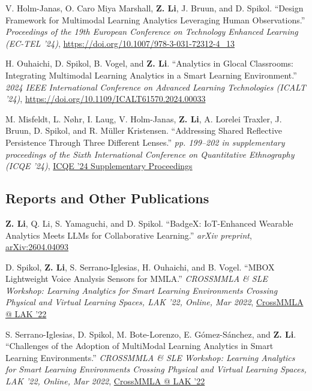 \documentclass[11pt,letterpaper]{report}
\begin{document}
\begin{tablist}
        \item[2024] \tab{} V. Holm-Janas, O. Caro Miya Marshall, \textbf{Z. Li}, J. Bruun, and D. Spikol. \enquote{Design Framework for Multimodal Learning Analytics Leveraging Human Observations.} \textit{Proceedings of the 19th European Conference on Technology Enhanced Learning (EC-TEL '24)}, \href{https://doi.org/10.1007/978-3-031-72312-4_13}{https://doi.org/10.1007/978-3-031-72312-4\_13}
        \item[2024] \tab{} H. Ouhaichi, D. Spikol, B. Vogel, and \textbf{Z. Li}. \enquote{Analytics in Glocal Classrooms: Integrating Multimodal Learning Analytics in a Smart Learning Environment.} \textit{2024 IEEE International Conference on Advanced Learning Technologies (ICALT '24)}, \href{https://doi.org/10.1109/ICALT61570.2024.00033}{https://doi.org/10.1109/ICALT61570.2024.00033}
        \item[2024] \tab{} M. Misfeldt, L. Nøhr, I. Laug, V. Holm-Janas, \textbf{Z. Li}, A. Lorelei Traxler, J. Bruun, D. Spikol, and R. Müller Kristensen. \enquote{Addressing Shared Reflective Persistence Through Three Different Lenses.} \textit{pp. 199--202 in supplementary proceedings of the Sixth International Conference on Quantitative Ethnography (ICQE '24)}, \href{https://www.qesoc.org/images/pdf/ICQE24_Supplement_Proceedings.pdf}{ICQE '24 Supplementary Proceedings}
    \end{tablist}

    \subsection*{Reports and Other Publications}

    \begin{tablist}
        \item[2026] \tab{} \textbf{Z. Li}, Q. Li, S. Yamaguchi, and D. Spikol. \enquote{BadgeX: IoT-Enhanced Wearable Analytics Meets LLMs for Collaborative Learning.} \textit{arXiv preprint}, \href{https://arxiv.org/abs/2604.04093}{arXiv:2604.04093}
        \item[2022] \tab{} D. Spikol, \textbf{Z. Li}, S. Serrano-Iglesias, H. Ouhaichi, and B. Vogel. \enquote{MBOX Lightweight Voice Analysis Sensors for MMLA.} \textit{CROSSMMLA \& SLE Workshop: Learning Analytics for Smart Learning Environments Crossing Physical and Virtual Learning Spaces, LAK '22, Online, Mar 2022}, \href{https://lizaibeim.github.io/pubs/CROSSMMLA22_paper_5.pdf}{CrossMMLA @ LAK '22}
        \item[2022] \tab{} S. Serrano-Iglesias, D. Spikol, M. Bote-Lorenzo, E. Gómez-Sánchez, and \textbf{Z. Li}. \enquote{Challenges of the Adoption of MultiModal Learning Analytics in Smart Learning Environments.} \textit{CROSSMMLA \& SLE Workshop: Learning Analytics for Smart Learning Environments Crossing Physical and Virtual Learning Spaces, LAK '22, Online, Mar 2022}, \href{https://lizaibeim.github.io/pubs/CROSSMMLA22_paper_2.pdf}{CrossMMLA @ LAK '22}
    \end{tablist}
\end{document}
